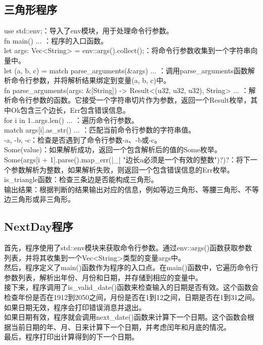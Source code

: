 \documentclass{article}
\begin{document}
\subsection{三角形程序}
use std::env;：导入了env模块，用于处理命令行参数。\\
fn main() { ... }：程序的入口函数。\\
let args: Vec<String> = env::args().collect();：将命令行参数收集到一个字符串向量中。\\
let (a, b, c) = match parse\_arguments(\&args) { ... }：调用parse\_arguments函数解析命令行参数，并将解析结果绑定到变量(a, b, c)中。\\
fn parse\_arguments(args: \&[String]) -> Result<(u32, u32, u32), String> { ... }：解析命令行参数的函数。它接受一个字符串切片作为参数，返回一个Result枚举，其中Ok包含三个边长，Err包含错误信息。\\
for i in 1..args.len() { ... }：遍历命令行参数。\\
match args[i].as\_str() { ... }：匹配当前命令行参数的字符串值。\\
-a, -b, -c：检查是否遇到了命令行参数-a、-b或-c。\\
Some(value)：如果解析成功，返回一个包含解析后的值的Some枚举。\\
Some(args[i + 1].parse().map\_err(|\_| "边长a必须是一个有效的整数")?)?：将下一个参数解析为整数，如果解析失败，则返回一个包含错误信息的Err枚举。\\
is\_triangle函数：检查三条边是否能构成三角形。\\
输出结果：根据判断的结果输出对应的信息，例如等边三角形、等腰三角形、不等边三角形或非三角形。\\

\subsection{NextDay程序}

首先，程序使用了std::env模块来获取命令行参数。通过env::args()函数获取参数列表，并将其收集到一个Vec<String>类型的变量args中。\\
然后，程序定义了main()函数作为程序的入口点。在main()函数中，它遍历命令行参数列表，解析出年份、月份和日期，并存储到相应的变量中。\\
接下来，程序调用了is\_valid\_date()函数来检查输入的日期是否有效。这个函数会检查年份是否在1912到2050之间，月份是否在1到12之间，日期是否在1到31之间。如果日期无效，程序会打印错误消息并退出。\\
如果日期有效，程序就会调用next\_date()函数来计算下一个日期。这个函数会根据当前日期的年、月、日来计算下一个日期，并考虑闰年和月底的情况。\\
最后，程序打印出计算得到的下一个日期。\\
\end{document}

